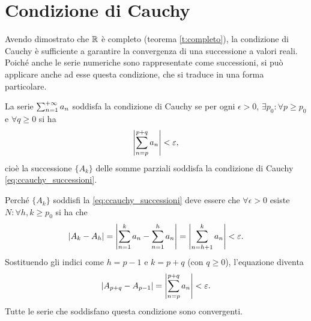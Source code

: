 \section{Condizione di Cauchy}
Avendo dimostrato che $\mathbb{R}$ è completo (teorema \ref{t:completo}), la condizione di Cauchy è sufficiente a garantire la convergenza di una successione a valori reali. Poiché anche le serie numeriche sono rappresentate come successioni, si può applicare anche ad esse questa condizione, che si traduce in una forma particolare.
\begin{definizione}
\label{d:ccauchy_serie}
La serie $\sum_{{n}=1}^{+\infty}a_n$ soddisfa la condizione di Cauchy se per ogni $\epsilon>0$, $\exists p_0\colon\forall p\geq p_0$ e $\forall q\geq 0$ si ha
\begin{equation}
\label{eq:ccauchy_serie}
\left|{\sum_{n=p}^{p+q}a_n}\right|<\varepsilon,
\end{equation}
cioè la successione $\{A_k\}$ delle somme parziali soddisfa la condizione di Cauchy \ref{eq:ccauchy_successioni}.
\end{definizione}
Perché $\{A_k\}$ soddisfi la \ref{eq:ccauchy_successioni} deve essere che $\forall\epsilon>0$ esiste $N\colon\forall h,k\geq p_0$ si ha che
\[
\left|{A_k-A_h}\right|=\left|{\sum_{n=1}^ka_n-\sum_{n=1}^ha_n}\right|=\left|{\sum_{n=h+1}^ka_n}\right|<\varepsilon.
\]
Sostituendo gli indici come $h=p-1$ e $k=p+q$ (con $q\geq 0$), l'equazione diventa
\[
\left|{A_{p+q}-A_{p-1}}\right|=\left|{\sum_{n=p}^{p+q}a_n}\right|<\varepsilon.
\]
Tutte le serie che soddisfano questa condizione sono convergenti.
